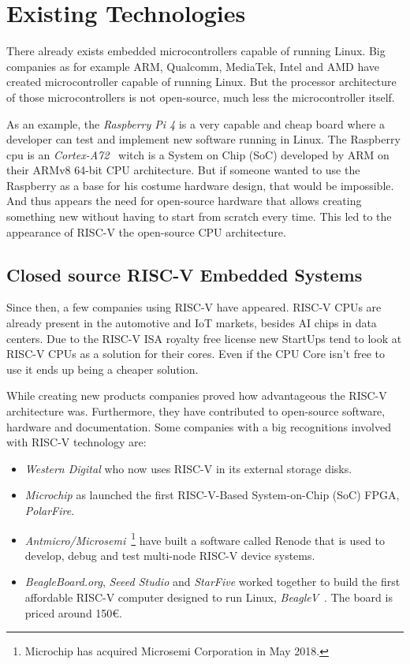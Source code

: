 \chapter{Existing Technologies}
There already exists embedded microcontrollers capable of running Linux. Big companies as for example ARM, Qualcomm, MediaTek, Intel and AMD have created microcontroller capable of running Linux. But the processor architecture of those microcontrollers is not open-source, much less the microcontroller itself. 

As an example, the \textit{Raspberry Pi 4} is a very capable and cheap board where a developer can test and implement new software running in Linux. The Raspberry \acrshort{cpu} is an \textit{Cortex-A72}~\cite{cortex_a72} witch is a System on Chip (SoC) developed by ARM on their ARMv8 64-bit CPU architecture. But if someone wanted to use the Raspberry as a base for his costume hardware design, that would be impossible. And thus appears the need for open-source hardware that allows creating something new without having to start from scratch every time. This led to the appearance of RISC-V the open-source CPU architecture.


\section{Closed source RISC-V Embedded Systems}
Since then, a few companies using RISC-V have appeared. RISC-V CPUs are already present in the automotive and IoT markets, besides AI chips in data centers. Due to the RISC-V ISA royalty free license new StartUps tend to look at RISC-V CPUs as a solution for their cores. Even if the CPU Core isn't free to use it ends up being a cheaper solution.

While creating new products companies proved how advantageous the RISC-V architecture was. Furthermore, they have contributed to open-source software, hardware and documentation. Some companies with a big recognitions involved with RISC-V technology are:
\begin{itemize}
    \item \textit{Western Digital} who now uses RISC-V in its external storage disks. 
    \item \textit{Microchip} as launched the first RISC-V-Based System-on-Chip (SoC) FPGA, \textit{PolarFire}. 
    \item \textit{Antmicro/Microsemi}~\footnote{Microchip has acquired Microsemi Corporation in May 2018.} have built a software called Renode that is used to develop, debug and test multi-node RISC-V device systems.
    \item \textit{BeagleBoard.org}, \textit{Seeed Studio} and \textit{StarFive} worked together to build the first affordable RISC-V computer designed to run Linux, \textit{BeagleV}~\cite{beagleV}. The board is priced around 150€.
\end{itemize}

